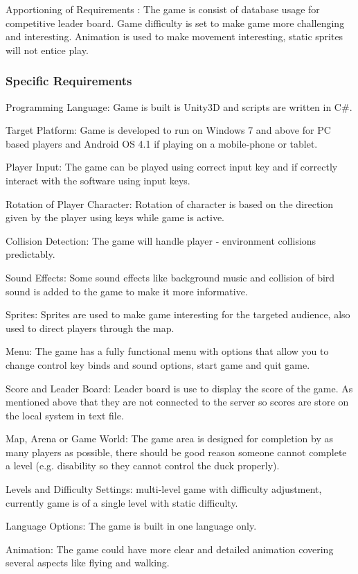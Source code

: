 \documentclass[12pt]{article}
\begin{document}
Apportioning of Requirements : The game is consist of database usage for competitive leader board. Game difficulty is set to make game more challenging and interesting. Animation is used to make movement interesting, static sprites will not entice play.

\subsubsection{Specific Requirements}
Programming Language: Game is built is Unity3D and scripts are written in C\#.

Target Platform: Game is developed to run on Windows 7 and above for PC based players and Android OS 4.1 if playing on a mobile-phone or tablet.

Player Input: The game can be played using correct input key and if correctly interact with the software using input keys.

Rotation of Player Character: Rotation of character is based on the direction given by the player using keys while game is active.

Collision Detection: The game will handle player - environment collisions predictably.

Sound Effects: Some sound effects like background music and collision of bird sound is added to the game to make it more informative.

Sprites: Sprites are used to make game interesting for the targeted audience, also used to direct players through the map.

Menu: The game has a fully functional menu with options that allow you to change control key binds and sound options, start game and quit game.

Score and Leader Board: Leader board is use to display the score of the game. As mentioned above that they are not connected to the server so scores are store on the local system in text file.

Map, Arena or Game World: The game area is designed for completion by as many players as possible, there should be good reason someone cannot complete a level (e.g. disability so they cannot control the duck properly).

Levels and Difficulty Settings: multi-level game with difficulty adjustment, currently game is of a single level with static difficulty.

Language Options: The game is built in one language only.

Animation: The game could have more clear and detailed animation covering several aspects like flying and walking.
\end{document}
